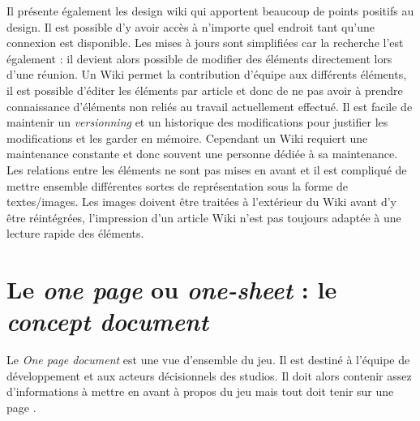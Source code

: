 Il présente également les \guillemotleft design wiki \guillemotright qui apportent beaucoup de points positifs au design. Il est possible d'y avoir accès à n'importe quel endroit tant qu'une connexion est disponible. Les mises à jours sont simplifiées car la recherche l'est également : il devient alors possible de modifier des éléments directement lors d'une réunion. Un Wiki permet la contribution d'équipe aux différents éléments, il est possible d'éditer les éléments par article et donc de ne pas avoir à prendre connaissance d'éléments non reliés au travail actuellement effectué. Il est facile de maintenir un \emph{versionning} et un historique des modifications pour justifier les modifications et les garder en mémoire. Cependant un Wiki requiert une maintenance constante et donc souvent une personne dédiée à sa maintenance. Les relations entre les éléments ne sont pas mises en avant et il est compliqué de mettre ensemble différentes sortes de représentation sous la forme de textes/images. Les images doivent être traitées à l'extérieur du Wiki avant d'y être réintégrées, l'impression d'un article Wiki n'est pas toujours adaptée à une lecture rapide des éléments.\\



\section{Le \emph{\guillemotleft one page \guillemotright} ou \emph{\guillemotleft one-sheet \guillemotright} : le \emph{concept document}}
Le \emph{One page document} est une vue d'ensemble du jeu. Il est destiné à l'équipe de développement et aux acteurs décisionnels des studios. Il doit alors contenir assez d'informations à mettre en avant à propos du jeu mais tout doit tenir sur une page \cite{LevelUpRogers2014}.


